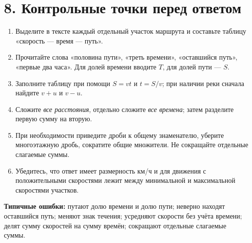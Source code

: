 \documentclass[a4paper,12pt]{article}
\begin{document}
\section*{8. Контрольные точки перед ответом}
\begin{enumerate}[label=\arabic*.]
\item Выделите в тексте каждый отдельный участок маршрута и составьте таблицу «скорость --- время --- путь».
\item Прочитайте слова «половина пути», «треть времени», «оставшийся путь», «первые два часа». Для долей времени вводите $T$, для долей пути --- $S$.
\item Заполните таблицу при помощи $S=vt$ и $t=S/v$; при наличии реки сначала найдите $v+u$ и $v-u$.
\item Сложите \emph{все расстояния}, отдельно сложите \emph{все времена}; затем разделите первую сумму на вторую.
\item При необходимости приведите дроби к общему знаменателю, уберите многоэтажную дробь, сократите общие множители. Не сокращайте отдельные слагаемые суммы.
\item Убедитесь, что ответ имеет размерность км/ч и для движения с положительными скоростями лежит между минимальной и максимальной скоростями участков.
\end{enumerate}
\textbf{Типичные ошибки:} путают долю времени и долю пути; неверно находят оставшийся путь; меняют знак течения; усредняют скорости без учёта времени; делят сумму скоростей на сумму времён; сокращают отдельные слагаемые суммы.
\end{document}
